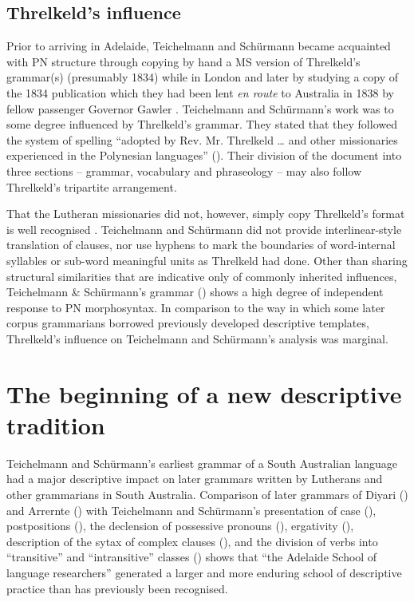 \subsection{Threlkeld’s influence}
\label{sec:key:5.2.2}

Prior to arriving in Adelaide, Teichelmann and Schürmann became acquainted with PN structure through copying by hand a MS version of Threlkeld’s grammar(s) (presumably 1834) while in London \citep[68]{rathjen_difficult_1998} and later by studying a copy of the 1834 publication which they had been lent \textit{en route} to Australia in 1838 by fellow passenger Governor Gawler \citep[65]{amery_warrabarna_2016}. Teichelmann and Schürmann’s work was to some degree influenced by Threlkeld’s grammar. They stated that they followed the system of spelling “adopted by Rev. Mr. Threlkeld … and other missionaries experienced in the Polynesian languages” (\citeyear[v]{teichelmann_outlines_1840}). Their division of the document into three sections -- grammar, vocabulary and phraseology -- may also follow Threlkeld’s tripartite arrangement. 

That the Lutheran missionaries did not, however, simply copy Threlkeld’s format is well recognised \citep[87]{amery_warrabarna_2016}. Teichelmann and Schürmann did not provide interlinear-style translation of clauses, nor use hyphens to mark the boundaries of word-internal syllables or sub-word meaningful units as Threlkeld had done. Other than sharing structural similarities that are indicative only of commonly inherited influences, Teichelmann \& Schürmann’s grammar (\citeyear{teichelmann_outlines_1840}) shows a high degree of independent response to PN morphosyntax. In comparison to the way in which some later corpus grammarians borrowed previously developed descriptive templates, Threlkeld’s influence on Teichelmann and Schürmann’s analysis was marginal.

\section{The beginning of a new descriptive tradition}
\label{sec:key:5.3}

Teichelmann and Schürmann’s earliest grammar of a South Australian language had a major descriptive impact on later grammars written by Lutherans and other grammarians in South Australia. 
Comparison of later grammars of Diyari () and Arrernte () with Teichelmann and Schürmann’s presentation of case (), postpositions (), the declension of possessive pronouns (), ergativity (), description of the sytax of complex clauses (), and the division of verbs into “transitive” and “intransitive” classes () shows that “the Adelaide School of language researchers” \citep[410]{simpson_notes_1992} generated a larger and more enduring school of descriptive practice than has previously been recognised.

